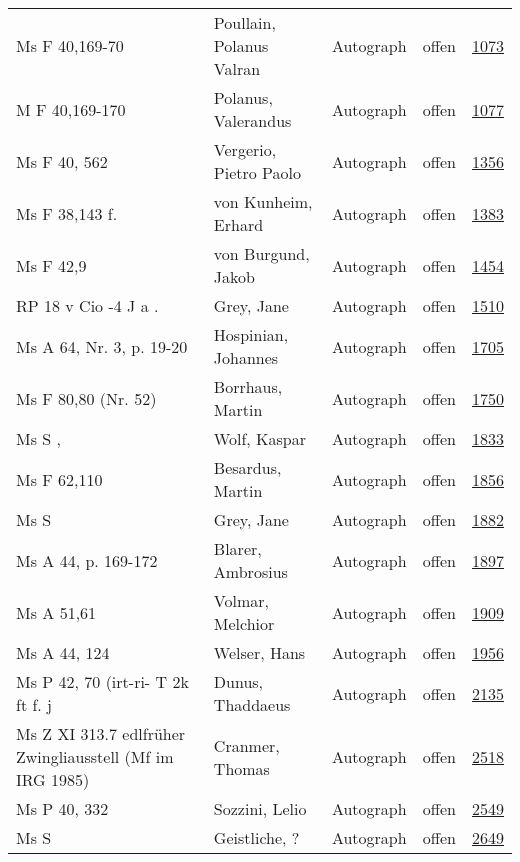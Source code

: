 \documentclass[10pt,a4paper,landscape]{report}
\begin{document}
\begin{longtable}{p{16cm}p{4cm}llr}
Ms F 40,169-70	&	Poullain, Polanus Valran	&	Autograph	&	offen	&	\href{http://130.60.24.72/assignment/1073}{1073}\\
M F 40,169-170	&	Polanus, Valerandus	&	Autograph	&	offen	&	\href{http://130.60.24.72/assignment/1077}{1077}\\
Ms F 40, 562	&	Vergerio, Pietro Paolo	&	Autograph	&	offen	&	\href{http://130.60.24.72/assignment/1356}{1356}\\
Ms F 38,143 f.	&	von Kunheim, Erhard	&	Autograph	&	offen	&	\href{http://130.60.24.72/assignment/1383}{1383}\\
Ms F 42,9	&	von Burgund, Jakob	&	Autograph	&	offen	&	\href{http://130.60.24.72/assignment/1454}{1454}\\
RP 18 v Cio -4 J a .	&	Grey, Jane	&	Autograph	&	offen	&	\href{http://130.60.24.72/assignment/1510}{1510}\\
Ms A 64, Nr. 3, p. 19-20	&	Hospinian, Johannes	&	Autograph	&	offen	&	\href{http://130.60.24.72/assignment/1705}{1705}\\
Ms F 80,80 (Nr. 52)	&	Borrhaus, Martin	&	Autograph	&	offen	&	\href{http://130.60.24.72/assignment/1750}{1750}\\
Ms S ,	&	Wolf, Kaspar	&	Autograph	&	offen	&	\href{http://130.60.24.72/assignment/1833}{1833}\\
Ms F 62,110	&	Besardus, Martin	&	Autograph	&	offen	&	\href{http://130.60.24.72/assignment/1856}{1856}\\
Ms S	&	Grey, Jane	&	Autograph	&	offen	&	\href{http://130.60.24.72/assignment/1882}{1882}\\
Ms A 44, p. 169-172	&	Blarer, Ambrosius	&	Autograph	&	offen	&	\href{http://130.60.24.72/assignment/1897}{1897}\\
Ms A 51,61	&	Volmar, Melchior	&	Autograph	&	offen	&	\href{http://130.60.24.72/assignment/1909}{1909}\\
Ms A 44, 124	&	Welser, Hans	&	Autograph	&	offen	&	\href{http://130.60.24.72/assignment/1956}{1956}\\
Ms P 42, 70 (irt-ri- T 2k ft f. j	&	Dunus, Thaddaeus	&	Autograph	&	offen	&	\href{http://130.60.24.72/assignment/2135}{2135}\\
Ms Z XI 313.7 edlfrüher Zwingliausstell (Mf im IRG 1985)	&	Cranmer, Thomas	&	Autograph	&	offen	&	\href{http://130.60.24.72/assignment/2518}{2518}\\
Ms P 40, 332	&	Sozzini, Lelio	&	Autograph	&	offen	&	\href{http://130.60.24.72/assignment/2549}{2549}\\
Ms S	&	Geistliche, ?	&	Autograph	&	offen	&	\href{http://130.60.24.72/assignment/2649}{2649}\\

\end{longtable}
\end{document}
